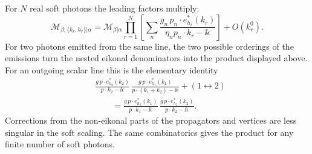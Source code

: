 For \(N\) real soft photons the leading factors multiply:
\[
  \mathcal M_{\beta;\{k_r,h_r\}|\alpha}
  =
  \mathcal M_{\beta|\alpha}
  \prod_{r=1}^{N}
  \left[
    \sum_n
    \frac{g_n\,p_n\cdot e_{h_r}^*(k_r)}
         {\eta_n p_n\cdot k_r-\ii\epsilon}
  \right]
  +O(k_r^0).
\]
For two photons emitted from the same line, the two possible orderings of the
emissions turn the nested eikonal denominators into the product displayed
above.  For an outgoing scalar line this is the elementary identity
\[
\begin{aligned}
  &\frac{g\,p\cdot e_{h_2}^*(k_2)}
        {p\cdot k_2-\ii\epsilon}\,
   \frac{g\,p\cdot e_{h_1}^*(k_1)}
        {p\cdot(k_1+k_2)-\ii\epsilon}
  +(1\leftrightarrow2)
\\
  &\qquad =
  \frac{g\,p\cdot e_{h_1}^*(k_1)}
       {p\cdot k_1-\ii\epsilon}\,
  \frac{g\,p\cdot e_{h_2}^*(k_2)}
       {p\cdot k_2-\ii\epsilon}.
\end{aligned}
\]
Corrections from the non-eikonal parts of the propagators and vertices are
less singular in the soft scaling.  The same combinatorics gives the product
for any finite number of soft photons.

